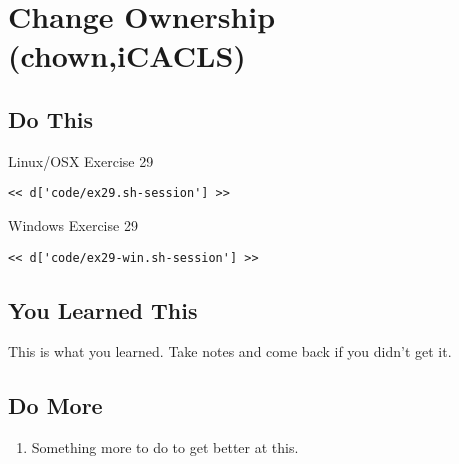 \chapter{Change Ownership (chown,iCACLS)}

\section{Do This}

\begin{code}{Linux/OSX Exercise 29}
\begin{Verbatim}
<< d['code/ex29.sh-session'] >>
\end{Verbatim}
\end{code}

\begin{code}{Windows Exercise 29}
\begin{Verbatim}
<< d['code/ex29-win.sh-session'] >>
\end{Verbatim}
\end{code}

\section{You Learned This}

This is what you learned.  Take notes and come back if you didn't get it.

\section{Do More}

\begin{enumerate}
\item Something more to do to get better at this.
\end{enumerate}

